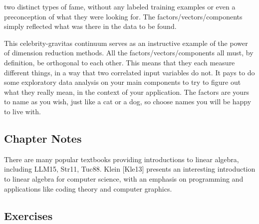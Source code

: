 \documentclass[10pt]{article}
\begin{document}
\noindent
two distinct types of fame, without any labeled training examples or even a preconception of what they were looking for. The factors/vectors/components simply reflected what was there in the data to be found.

This celebrity-gravitas continuum serves as an instructive example of the power of dimension reduction methods. All the factors/vectors/components all must, by definition, be orthogonal to each other. This means that they each measure different things, in a way that two correlated input variables do not. It pays to do some exploratory data analysis on your main components to try to figure out what they really mean, in the context of your application. The factors are yours to name as you wish, just like a cat or a dog, so choose names you will be happy to live with.

\subsection{Chapter Notes}
There are many popular textbooks providing introductions to linear algebra, including LLM15, Str11, Tuc88. Klein [Kle13] presents an interesting introduction to linear algebra for computer science, with an emphasis on programming and applications like coding theory and computer graphics.

\subsection{Exercises}
\end{document}
